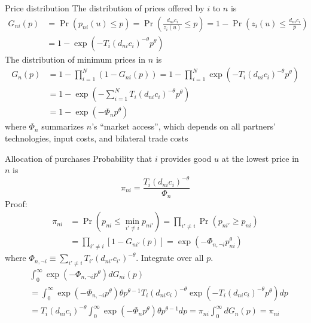 \documentclass[10pt,notes=hide]{beamer}
\begin{document}
\begin{frame}{Price distribution}
The distribution of prices offered by $i$ to $n$ is
\begin{align*}
G_{ni}\left( p\right) 
&=\Pr \left( p_{ni}(u) \leq p\right)
=\Pr \left( \frac{d _{ni}c_{i}}{z_{i}(u) }\leq p\right)
=1-\Pr \left( z_{i}(u) \leq \frac{d _{ni}c_{i}}{p}\right) \\
&=1-\exp \left( -T_{i}\left( d _{ni}c_{i}\right) ^{-\theta}p^{\theta}\right)
\end{align*}
The distribution of minimum prices in $n$ is
\begin{align*}
G_{n}\left( p\right) 
&=1-\prod_{i=1}^{N}\left( 1-G_{ni}\left( p\right) \right)
=1-\prod_{i=1}^{N}\exp \left( -T_{i}\left(d_{ni}c_{i}\right) ^{-\theta}p^{\theta }\right) \\
&=1-\exp \left(-{\sum_{i=1}^{N}T_{i}\left(d_{ni}c_{i}\right) ^{-\theta}}p^{\theta }\right) \\
&=1-\exp \left( -\Phi _{n}p^{\theta }\right)
\end{align*}
where $\Phi_{n}$ summarizes $n$'s ``market access'',
which depends on all partners' technologies, input costs, and bilateral trade costs
\end{frame}
\begin{frame}{Allocation of purchases}
Probability that $i$ provides good $u$ at the lowest price in $n$ is
\begin{equation*}
\pi_{ni}=\frac{T_{i}\left(d_{ni}c_{i}\right) ^{-\theta}}{\Phi_{n}}
\end{equation*}
Proof:
\begin{align*}
\pi_{ni}
& = \Pr\left(p_{ni} \leq \min_{i'\neq i} p_{ni'}\right) 
 = \prod_{i' \neq i} \Pr \left(p_{ni'} \geq p_{ni}\right) \\
& = \prod_{i' \neq i} \left[1 - G_{ni'}(p)\right]
 = \exp\left(-\Phi_{n,\neg i}p_{ni}^{\theta}\right)
\end{align*}
where $\Phi_{n,\neg i} \equiv {\sum_{i' \neq i}T_{i'}\left(d_{ni'}c_{i'}\right) ^{-\theta}}$.
Integrate over all $p$. %
\begin{align*}
&\int_{0}^{\infty} \exp\left(-\Phi_{n,\neg i}p^{\theta}\right) dG_{ni}(p) \\
&=
\int_{0}^{\infty} \exp\left(-\Phi_{n,\neg i}p^{\theta}\right) \theta p^{\theta-1} T_{i}\left( d _{ni}c_{i}\right) ^{-\theta} \exp \left( -T_{i}\left( d _{ni}c_{i}\right) ^{-\theta}p^{\theta}\right) dp \\
&=
T_{i}\left(d _{ni}c_{i}\right)^{-\theta}
\int_{0}^{\infty} \exp\left(-\Phi_{n}p^{\theta}\right) \theta p^{\theta-1} dp
= \pi_{ni} \int_{0}^{\infty} dG_n(p) = \pi_{ni}
\end{align*}
\end{frame}
\end{document}
